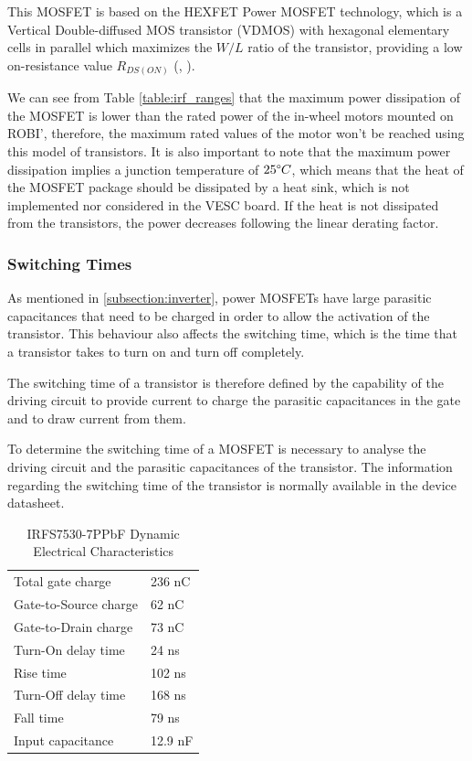 This \ac{MOSFET} is based on the HEXFET Power \ac{MOSFET} technology, which is a Vertical Double-diffused MOS transistor (VDMOS) with hexagonal elementary cells in parallel which maximizes the $W/L$ ratio of the transistor, providing a low on-resistance value $R_{DS(ON)}$ (\citeauthor{GhioniPowerElec}, \citeyear{GhioniPowerElec}).

We can see from Table \ref{table:irf_ranges} that the maximum power dissipation of the \ac{MOSFET} is lower than the rated power of the in-wheel motors mounted on ROBI', therefore, the maximum rated values of the motor won't be reached using this model of transistors. It is also important to note that the maximum power dissipation implies a junction temperature of $25\degree C$, which means that the heat of the \ac{MOSFET} package should be dissipated by a heat sink, which is not implemented nor considered in the VESC board. If the heat is not dissipated from the transistors, the power decreases following the linear derating factor.

\subsubsection{Switching Times}\label{switching_times}

As mentioned in \ref{subsection:inverter}, power \ac{MOSFET}s have large parasitic capacitances that need to be charged in order to allow the activation of the transistor. This behaviour also affects the switching time, which is the time that a transistor takes to turn on and turn off completely.

The switching time of a transistor is therefore defined by the capability of the driving circuit to provide current to charge the parasitic capacitances in the gate and to draw current from them.

To determine the switching time of a \ac{MOSFET} is necessary to analyse the driving circuit and the parasitic capacitances of the transistor. The information regarding the switching time of the transistor is normally available in the device datasheet.

\begin{table}[]
\centering
\caption{IRFS7530-7PPbF Dynamic Electrical Characteristics}
\label{table:switchtime}
\begin{tabular}{@{}ll@{}}
\toprule
Total gate charge 		& 236 nC \\
Gate-to-Source charge 	& 62 nC \\
Gate-to-Drain charge 	& 73 nC \\
Turn-On delay time   	& 24 ns \\
Rise time       		& 102 ns \\
Turn-Off delay time     & 168 ns \\ 
Fall time               & 79 ns \\
Input capacitance  		& 12.9 nF \\
\bottomrule
\end{tabular}
\end{table}

